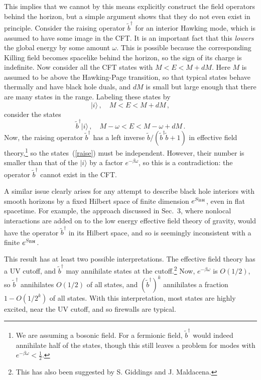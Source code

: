 \documentclass[12pt]{article}
\newcommand{\be}{\begin{equation}}
\newcommand{\ee}{\end{equation}}
\begin{document}
{This implies that we cannot by this means explicitly construct  the field operators behind the horizon, but a simple argument shows that they do not even exist in principle.  Consider the raising operator $\tilde b^\dagger$ for an interior Hawking mode, which is assumed to have some image in the CFT.  It is an important fact that this {\it lowers} the global energy by some amount $\omega$.  This is possible because the corresponding Killing field becomes spacelike behind the horizon, so the sign of its charge is indefinite.  Now consider all the CFT states with $M < E < M + dM$.   Here $M$ is assumed to be above the Hawking-Page transition, so that typical states behave thermally and have black hole duals, and $dM$ is small but large enough that there are many states in the range.  Labeling these states by
\be
|i\rangle\,, \quad  M < E < M + dM \,,
\ee
consider the states
\be
\tilde b^\dagger |i\rangle \,,  \quad  M - \omega < E < M - \omega + dM \label{raise} \,.
\ee
Now, the raising operator $\tilde b^\dagger$ has a left inverse $\tilde b/(\tilde b^\dagger \tilde b + 1)$ in effective field theory,\footnote{{We are assuming a bosonic field.  For a fermionic field, $\tilde b^\dagger$ would indeed annihilate half of the states, though this still leaves a problem for modes with $e^{-\beta\omega} < \frac{1}{2}$.}}
so the states~(\ref{raise}) must be independent.  However, their number is smaller than that of the $|i\rangle$ by a factor $e^{-\beta\omega}$, so this is a contradiction: the operator $\tilde b^\dagger$ cannot exist in the CFT.

A similar issue clearly arises for any attempt to describe black hole interiors with smooth horizons by a fixed Hilbert space of finite dimension $e^{S_{\rm BH}}$, even in flat spacetime.  For example, the approach discussed in Sec.~3, where nonlocal interactions are added on to the low energy effective field theory of gravity, would have the operator $\tilde b^\dagger$ in its Hilbert space, and so is seemingly inconsistent with a finite $e^{S_{\rm BH}}$.

This result has at least two possible interpretations.  The effective field theory has a UV cutoff, and $\tilde b^\dagger$ may annihilate states at the cutoff.\footnote{This has also been suggested by S. Giddings and J. Maldacena.}  Now, $e^{-\beta\omega}$ is $O(1/2)$, so $\tilde b^\dagger$ annihilates $O(1/2)$ of all states, and $(\tilde b^\dagger)^k$ annihilates {a fraction $1 - O(1/2^k)$} of all states.  With this interpretation, most states are highly excited, near the UV cutoff, and so firewalls are typical.

}
\end{document}
